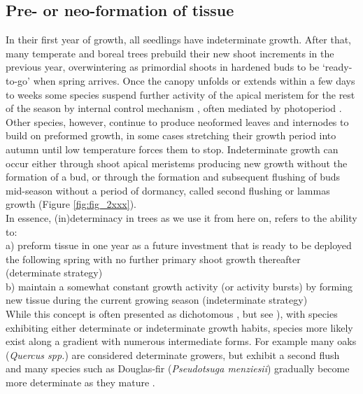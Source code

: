 \documentclass{article}
\begin{document}
	\subsection*{Pre- or neo-formation of tissue}
	In their first year of growth, all seedlings have indeterminate growth. After that, many temperate and boreal trees prebuild their new shoot increments in the previous year, overwintering as primordial shoots in hardened buds to be `ready-to-go' when spring arrives. Once the canopy unfolds or extends within a few days to weeks some species suspend further activity of the apical meristem for the rest of the season by internal control mechanism \citep[paradormancy,][]{langEndoParaEcodormancy1987}, often mediated by photoperiod \citep{bohleniusCOFTRegulatory2006a}. Other species, however, continue to produce neoformed leaves and internodes to build on preformed growth, in some cases stretching their growth period into autumn until low temperature forces them to stop. Indeterminate growth can occur either through shoot apical meristems producing new growth without the formation of a bud, or through the formation and subsequent flushing of buds mid-season without a period of dormancy, called second flushing or lammas growth (Figure \ref{fig:fig_2xxx}). \\
	In essence, (in)determinacy in trees as we use it from here on, refers to the ability to:\\
	a) preform tissue in one year as a future investment that is ready to be deployed the following spring with no further primary shoot growth thereafter (determinate strategy)\\
	b) maintain a somewhat constant growth activity (or activity bursts) by forming new tissue during the current growing season (indeterminate strategy)\\

While this concept is often presented as dichotomous \citep{kozlowskiGrowthControlWoody1997, lechowiczWhyTemperateDeciduous1984a}, but see \citealp{kikuzawaLeafSurvivalWoody1983, damascosBudCompositionBranching2005}), with species exhibiting either determinate or indeterminate growth habits, species more likely exist along a gradient with numerous intermediate forms. For example many oaks (\textit{Quercus spp.}) are considered determinate growers, but exhibit a second flush and many species such as Douglas-fir (\textit{Pseudotsuga menziesii}) gradually become more determinate as they mature \citep{borchertConceptJuvenilityWoody1976, heuretOntogeneticTrendsMorphological2006}.\\
\end{document}
